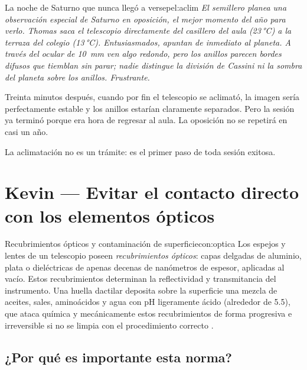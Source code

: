 \documentclass[12pt,oneside]{book}
\begin{document}
\begin{peligro}{La noche de Saturno que nunca llegó a verse}{pel:aclim}
    \itshape
    El semillero planea una observación especial de Saturno en oposición, el mejor
    momento del año para verlo. Thomas saca el telescopio directamente del casillero
    del aula (23\,°C) a la terraza del colegio (13\,°C). Entusiasmados, apuntan de
    inmediato al planeta. A través del ocular de 10~mm ven algo redondo, pero los
    anillos parecen bordes difusos que tiemblan sin parar; nadie distingue la división
    de Cassini ni la sombra del planeta sobre los anillos. Frustrante.

    Treinta minutos después, cuando por fin el telescopio se aclimató, la imagen
    sería perfectamente estable y los anillos estarían claramente separados. Pero
    la sesión ya terminó porque era hora de regresar al aula. La oposición no se
    repetirá en casi un año.

    \medskip
    \normalfont
    La aclimatación no es un trámite: es el primer paso de toda sesión exitosa.
    \cite{suiter1994,tonkin2007}
\end{peligro}

\section{Kevin — Evitar el contacto directo con los elementos ópticos}

\begin{concepto}{Recubrimientos ópticos y contaminación de superficie}{con:optica}
    Los espejos y lentes de un telescopio poseen \emph{recubrimientos ópticos}:
    capas delgadas de aluminio, plata o dieléctricas de apenas decenas de nanómetros
    de espesor, aplicadas al vacío. Estos recubrimientos determinan la reflectividad
    y transmitancia del instrumento. Una huella dactilar deposita sobre la superficie
    una mezcla de aceites, sales, aminoácidos y agua con pH ligeramente ácido
    (alrededor de 5.5), que ataca química y mecánicamente estos recubrimientos de
    forma progresiva e irreversible si no se limpia con el procedimiento correcto
    \cite{smith2000}.
\end{concepto}

\subsection{¿Por qué es importante esta norma?}
\end{document}
